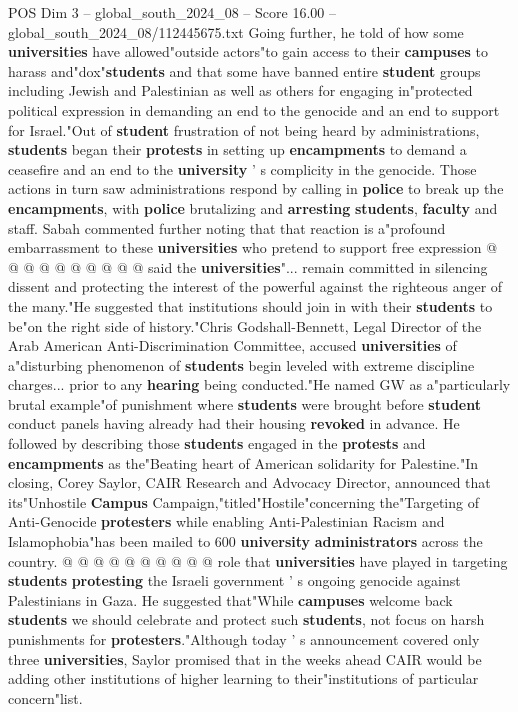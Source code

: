 \begin{textsample}{POS Dim 3 – global\_south\_2024\_08 – Score 16.00 – global\_south\_2024\_08/112445675.txt}
Going further, he told of how some \textbf{universities} have allowed"outside actors"to gain access to their \textbf{campuses} to harass and"dox"\textbf{students} and that some have banned entire \textbf{student} groups including Jewish and Palestinian as well as others for engaging in"protected political expression in demanding an end to the genocide and an end to support for Israel."Out of \textbf{student} frustration of not being heard by administrations, \textbf{students} began their \textbf{protests} in setting up \textbf{encampments} to demand a ceasefire and an end to the \textbf{university} ' s complicity in the genocide.
Those actions in turn saw administrations respond by calling in \textbf{police} to break up the \textbf{encampments}, with \textbf{police} brutalizing and \textbf{arresting} \textbf{students}, \textbf{faculty} and staff.
Sabah commented further noting that that reaction is a"profound embarrassment to these \textbf{universities} who pretend to support free expression @ @ @ @ @ @ @ @ @ @ said the \textbf{universities}"... remain committed in silencing dissent and protecting the interest of the powerful against the righteous anger of the many."He suggested that institutions should join in with their \textbf{students} to be"on the right side of history."Chris Godshall-Bennett, Legal Director of the Arab American Anti-Discrimination Committee, accused \textbf{universities} of a"disturbing phenomenon of \textbf{students} begin leveled with extreme discipline charges... prior to any \textbf{hearing} being conducted."He named GW as a"particularly brutal example"of punishment where \textbf{students} were brought before \textbf{student} conduct panels having already had their housing \textbf{revoked} in advance.
He followed by describing those \textbf{students} engaged in the \textbf{protests} and \textbf{encampments} as the"Beating heart of American solidarity for Palestine."In closing, Corey Saylor, CAIR Research and Advocacy Director, announced that its"Unhostile \textbf{Campus} Campaign,"titled"Hostile"concerning the"Targeting of Anti-Genocide \textbf{protesters} while enabling Anti-Palestinian Racism and Islamophobia"has been mailed to 600 \textbf{university} \textbf{administrators} across the country. @ @ @ @ @ @ @ @ @ @ role that \textbf{universities} have played in targeting \textbf{students} \textbf{protesting} the Israeli government ' s ongoing genocide against Palestinians in Gaza.
He suggested that"While \textbf{campuses} welcome back \textbf{students} we should celebrate and protect such \textbf{students}, not focus on harsh punishments for \textbf{protesters}."Although today ' s announcement covered only three \textbf{universities}, Saylor promised that in the weeks ahead CAIR would be adding other institutions of higher learning to their"institutions of particular concern"list.

\end{textsample}
